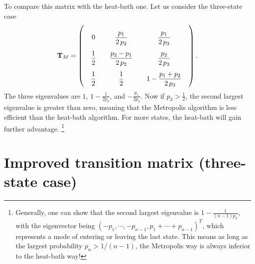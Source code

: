 \documentclass[12pt]{article}
\begin{document}
To compare this matrix with the heat-bath one.
Let us consider the three-state case
$$
\mathbf T_M =
\left(
  \arraycolsep=10.0pt\def\arraystretch{2.5}
  \begin{array}{cccccc}
    0   & \dfrac{p_1}{2 \, p_2} & \dfrac{p_1}{2 \, p_3} \\
    \dfrac{1}{2} & \dfrac{p_2-p_1}{2 \, p_2} & \dfrac{p_2}{2 \, p_3} \\
    \dfrac{1}{2} & \dfrac{1}{2} & 1 - \dfrac{p_1 + p_{2}}{2 \, p_3}
  \end{array}
\right).
$$
The three eigenvalues are
$1$, $1 - \frac{1}{2 p_3}$, and $-\frac{p_1}{2 p_2}$.
%
Now if $p_3 > \frac{1}{2}$, the second largest eigenvalue
is greater than zero, meaning that the Metropolis algorithm
is less efficient than the heat-bath algorithm.
For more states, the heat-bath will gain further advantage.
\footnote{
Generally, one can show that
the second largest eigenvalue is $1- \frac{1}{(n-1)p_n}$,
with the eigenvector being
$(-p_1, \cdots, -p_{n-1}, p_1 + \cdots + p_{n-1})^T$,
which represents a mode of entering or leaving the last state.
This means as long as the largest probability $p_n > 1/(n-1)$,
the Metropolis way is always inferior to the heat-bath way!
}


\section{Improved transition matrix (three-state case)}
\end{document}
